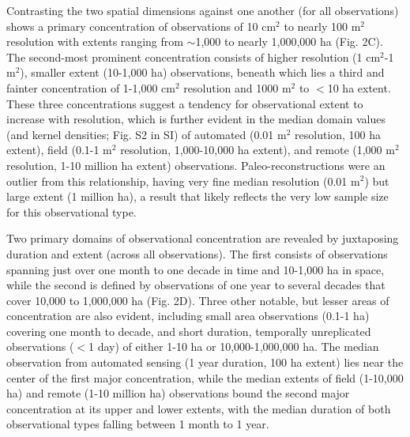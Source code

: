 \documentclass[12pt]{article}
\begin{document}
Contrasting the two spatial dimensions against one another (for all observations) shows a primary concentration of observations of 10 cm$^2$ to nearly 100 m$^2$ resolution with extents ranging from $\sim$1,000 to nearly 1,000,000 ha (Fig. 2C). The second-most prominent concentration consists of higher resolution (1 cm$^2$-1 m$^2$), smaller extent (10-1,000 ha) observations, beneath which lies a third and fainter concentration of 1-1,000 cm$^2$ resolution and 1000 m$^2$ to $<$10 ha extent. These three concentrations suggest a tendency for observational extent to increase with resolution, which is further evident in the median domain values (and kernel densities; Fig. S2 in SI) of automated (0.01 m$^2$ resolution, 100 ha extent), field (0.1-1 m$^2$ resolution, 1,000-10,000 ha extent), and remote (1,000 m$^2$ resolution, 1-10 million ha extent) observations.  Paleo-reconstructions were an outlier from this relationship, having very fine median resolution (0.01 m$^2$) but large extent (1 million ha), a result that likely reflects the very low sample size for this observational type. 

Two primary domains of observational concentration are revealed by juxtaposing duration and extent (across all observations). The first consists of observations spanning just over one month to one decade in time and 10-1,000 ha in space, while the second is defined by observations of one year to several decades that cover 10,000 to 1,000,000 ha (Fig. 2D).  Three other notable, but lesser areas of concentration are also evident, including small area observations (0.1-1 ha) covering one month to decade, and short duration, temporally unreplicated observations ($<$1 day) of either 1-10 ha or 10,000-1,000,000 ha.  The median observation from automated sensing (1 year duration, 100 ha extent) lies near the center of the first major concentration, while the median extents of field (1-10,000 ha) and remote (1-10 million ha) observations bound the second major concentration at its upper and lower extents, with the median duration of both observational types falling between 1 month to 1 year. 
\end{document}
